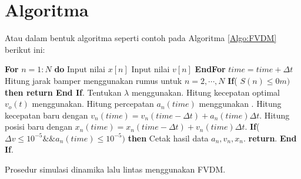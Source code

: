\section{Algoritma}
 Atau dalam bentuk algoritma seperti contoh pada Algoritma \ref{Algo:FVDM} berikut ini:
 

\begin{algorithm}
 \begin{algorithmic}[1]
    \State {}
	\State \textbf{For }$n=1:N$\textbf{ do} 
	\State \hspace{0.5cm} Input nilai $x[n]$
	\State \hspace{0.5cm} Input nilai $v[n]$
	\State \textbf{EndFor}
	\State {}
	\State \hspace{0.5cm} $time=time +\Delta t$
	\State \hspace{0.5cm} Hitung jarak bamper menggunakan rumus  untuk $n=2,\cdots,N$ 
	\State \hspace{0.5cm} \textbf{If}( $S(n) \leq 0 m)$ \textbf{then return End If}.
	\State \hspace{0.5cm} Tentukan $\lambda$ menggunakan.
	\State \hspace{0.5cm} Hitung kecepatan optimal $v_o(t)$ menggunakan.
	\State \hspace{0.5cm} Hitung percepatan $a_n(time)$ menggunakan .
	\State \hspace{0.5cm} Hitung kecepatan baru dengan $v_n(time)=v_n(time-\Delta t) + a_n(time) \Delta t$.
	\State \hspace{0.5cm} Hitung posisi baru dengan $x_n(time)=x_n(time-\Delta t) + v_n(time) \Delta t$.
	\State \hspace{0.5cm} \textbf{If}( $\Delta v \leq 10^{-5} \&\& a_n(time)\leq 10^{-5})$ \textbf{then}  
    \State \hspace{0.5cm} \hspace{0.5cm} Cetak hasil data $a_n, v_n, x_n$.
	\State \hspace{0.5cm} \hspace{0.5cm} \textbf{return}.
	\State \hspace{0.5cm} \textbf{End If}.
	\EndWhile
	\State {}
 \EndProcedure
 \end{algorithmic}
 \caption{Prosedur simulasi dinamika lalu lintas menggunakan FVDM.}\label{Algo:FVDM}
\end{algorithm}